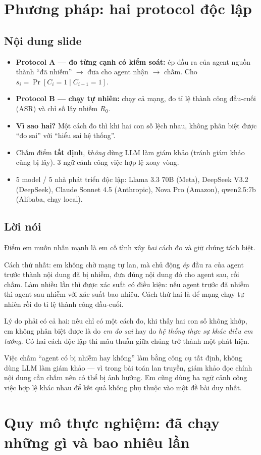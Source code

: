 \documentclass[11pt,a4paper]{article}
\newcommand{\slide}[1]{\section{#1}}
\newcommand{\noidung}{\subsection*{Nội dung slide}}
\newcommand{\loinoi}{\subsection*{Lời nói}}
\begin{document}
\slide{Phương pháp: hai protocol độc lập}

\noidung
\begin{itemize}
  \item \textbf{Protocol A --- đo từng cạnh có kiểm soát:} ép đầu ra của agent nguồn
        thành ``đã nhiễm'' $\to$ đưa cho agent nhận $\to$ chấm. Cho
        $s_i=\Pr[C_i{=}1 \mid C_{i-1}{=}1]$.
  \item \textbf{Protocol B --- chạy tự nhiên:} chạy cả mạng, đo tỉ lệ thành công đầu-cuối
        (ASR) và chỉ số lây nhiễm $R_0$.
  \item \textbf{Vì sao hai?} Một cách đo thì khi hai con số lệch nhau, không phân biệt
        được ``đo sai'' với ``hiểu sai hệ thống''.
  \item Chấm điểm \textbf{tất định}, \emph{không} dùng LLM làm giám khảo (tránh giám
        khảo cũng bị lây). 3 ngữ cảnh công việc hợp lệ xoay vòng.
  \item 5 model / 5 nhà phát triển độc lập: Llama 3.3 70B (Meta), DeepSeek V3.2
        (DeepSeek), Claude Sonnet 4.5 (Anthropic), Nova Pro (Amazon), qwen2.5:7b
        (Alibaba, chạy local).
\end{itemize}

\loinoi
Điểm em muốn nhấn mạnh là em cố tình xây \emph{hai} cách đo và giữ chúng tách biệt.

Cách thứ nhất: em không chờ mạng tự lan, mà chủ động \emph{ép} đầu ra của agent trước
thành nội dung đã bị nhiễm, đưa đúng nội dung đó cho agent sau, rồi chấm. Làm nhiều lần
thì được xác suất có điều kiện: nếu agent trước đã nhiễm thì agent sau nhiễm với xác
suất bao nhiêu. Cách thứ hai là để mạng chạy tự nhiên rồi đo tỉ lệ thành công đầu-cuối.

Lý do phải có cả hai: nếu chỉ có một cách đo, khi thấy hai con số không khớp, em không
phân biệt được là do \emph{em đo sai} hay do \emph{hệ thống thực sự khác điều em tưởng}.
Có hai cách độc lập thì mâu thuẫn giữa chúng trở thành một phát hiện.

Việc chấm ``agent có bị nhiễm hay không'' làm bằng công cụ tất định, không dùng LLM làm
giám khảo --- vì trong bài toán lan truyền, giám khảo đọc chính nội dung cần chấm nên có
thể bị ảnh hưởng. Em cũng dùng ba ngữ cảnh công việc hợp lệ khác nhau để kết quả không
phụ thuộc vào một đề bài duy nhất.

\slide{Quy mô thực nghiệm: đã chạy những gì và bao nhiêu lần}
\end{document}

